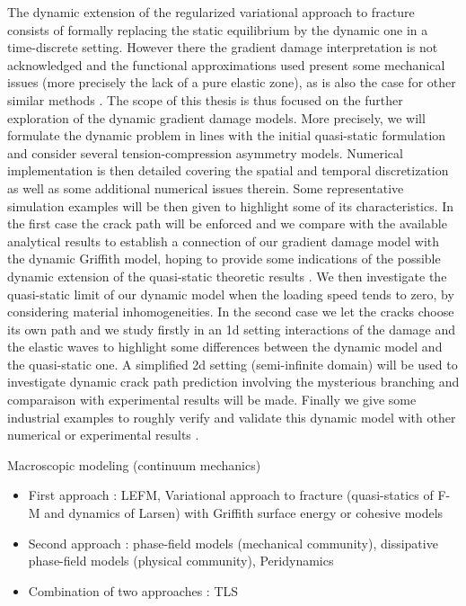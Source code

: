 The dynamic extension \cite{Bourdin:2011} of the regularized variational approach to fracture consists of formally replacing the static equilibrium by the dynamic one in a time-discrete setting. However there the gradient damage interpretation is not acknowledged and the functional approximations used present some mechanical issues (more precisely the lack of a pure elastic zone), as is also the case for other similar methods \cite{BordenVerhooselScottHughesLandis:2012,HofackerMiehe:2012,SchlueterWillenbuecherKuhnMueller:2014}. The scope of this thesis is thus focused on the further exploration of the dynamic gradient damage models. More precisely, we will formulate the dynamic problem in lines with the initial quasi-static formulation \cite{PhamMarigo:2010-1} and consider several tension-compression asymmetry models. Numerical implementation is then detailed covering the spatial and temporal discretization as well as some additional numerical issues therein. Some representative simulation examples will be then given to highlight some of its characteristics. In the first case the crack path will be enforced and we compare with the available analytical results to establish a connection of our gradient damage model with the dynamic Griffith model, hoping to provide some indications of the possible dynamic extension of the quasi-static theoretic results \cite{SicsicMarigo:2013}. We then investigate the quasi-static limit of our dynamic model when the loading speed tends to zero, by considering material inhomogeneities. In the second case we let the cracks choose its own path and we study firstly in an 1d setting interactions of the damage and the elastic waves to highlight some differences between the dynamic model and the quasi-static one. A simplified 2d setting (semi-infinite domain) will be used to investigate dynamic crack path prediction involving the mysterious branching and comparaison with experimental results \cite{Ravi-ChandarKnauss:1984a,Ravi-ChandarKnauss:1984b} will be made. Finally we give some industrial examples to roughly verify and validate this dynamic model with other numerical or experimental results \cite{SongWangBelytschko:2008}.

Macroscopic modeling (continuum mechanics)
\begin{itemize}
\item First approach : LEFM, Variational approach to fracture (quasi-statics of F-M and dynamics of Larsen) with Griffith surface energy or cohesive models
\item Second approach : phase-field models (mechanical community), dissipative phase-field models (physical community), Peridynamics
\item Combination of two approaches : TLS
\end{itemize}


